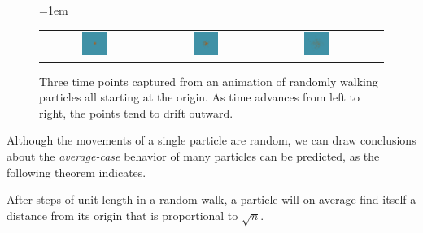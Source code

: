 \begin{figure}[h]
\centering
\mySfFamily
\tabcolsep=1em
\begin{tabular}{c c c c}
\includegraphics[width=0.25\textwidth]{../images/random_walk_particles_1} & \includegraphics[width=0.25\textwidth]{../images/random_walk_particles_2} & \includegraphics[width=0.25\textwidth]{../images/random_walk_particles_4}\\
\end{tabular}
\caption{Three time points captured from an animation of randomly walking particles all starting at the origin. As time advances from left to right, the points tend to drift outward.}
\label{fig:random_walk_multiple_particles}
\end{figure}

Although the movements of a single particle are random, we can draw conclusions about the \textit{average-case} behavior of many particles can be predicted, as the following theorem indicates.

\begin{namedtheorem}
After  steps of unit length in a random walk, a particle will on average find itself a distance from its origin that is proportional to $\sqrt{n}$.
\end{namedtheorem}

\fudgespace

\begin{note}\end{note}

